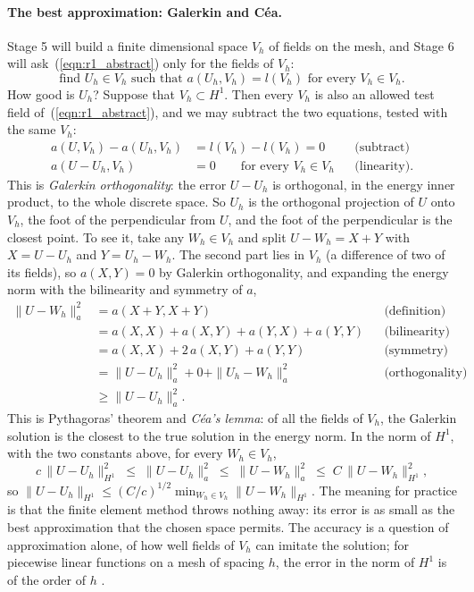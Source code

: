 \paragraph{The best approximation: Galerkin and C\'ea.} Stage 5 will build a finite dimensional space $V_h$ of fields on the mesh, and Stage 6 will ask~(\ref{eqn:r1_abstract}) only for the fields of $V_h$:
\begin{equation}
\label{eqn:r1_galerkin_abstract}
\text{find } U_h \in V_h \text{ such that } a(U_h, V_h) = l(V_h) \text{ for every } V_h \in V_h .
\end{equation}
How good is $U_h$? Suppose that $V_h \subset H^1$. Then every $V_h$ is also an allowed test field of~(\ref{eqn:r1_abstract}), and we may subtract the two equations, tested with the same $V_h$:
\begin{align*}
a(U, V_h) - a(U_h, V_h) &= l(V_h) - l(V_h) = 0 && \text{(subtract)} \\
a(U - U_h, V_h) &= 0 \qquad \text{for every } V_h \in V_h && \text{(linearity)}.
\end{align*}
This is \emph{Galerkin orthogonality}: the error $U - U_h$ is orthogonal, in the energy inner product, to the whole discrete space. So $U_h$ is the orthogonal projection of $U$ onto $V_h$, the foot of the perpendicular from $U$, and the foot of the perpendicular is the closest point. To see it, take any $W_h \in V_h$ and split $U - W_h = X + Y$ with $X = U - U_h$ and $Y = U_h - W_h$. The second part lies in $V_h$ (a difference of two of its fields), so $a(X, Y) = 0$ by Galerkin orthogonality, and expanding the energy norm with the bilinearity and symmetry of $a$,
\begin{align*}
\|U - W_h\|_a^2 &= a(X + Y, X + Y) && \text{(definition)} \\
&= a(X, X) + a(X, Y) + a(Y, X) + a(Y, Y) && \text{(bilinearity)} \\
&= a(X, X) + 2\,a(X, Y) + a(Y, Y) && \text{(symmetry)} \\
&= \|U - U_h\|_a^2 + 0 + \|U_h - W_h\|_a^2 && \text{(orthogonality)} \\
&\geq \|U - U_h\|_a^2 .
\end{align*}
This is Pythagoras' theorem and \emph{C\'ea's lemma}: of all the fields of $V_h$, the Galerkin solution is the closest to the true solution in the energy norm. In the norm of $H^1$, with the two constants above,
for every $W_h \in V_h$,
\begin{equation*}
c\,\|U - U_h\|_{H^1}^2 \;\le\; \|U - U_h\|_a^2 \;\le\; \|U - W_h\|_a^2 \;\le\; C\,\|U - W_h\|_{H^1}^2 ,
\end{equation*}
so $\|U - U_h\|_{H^1} \leq (C/c)^{1/2} \min_{W_h \in V_h} \|U - W_h\|_{H^1}$. The meaning for practice is that the finite element method throws nothing away: its error is as small as the best approximation that the chosen space permits. The accuracy is a question of approximation alone, of how well fields of $V_h$ can imitate the solution; for piecewise linear functions on a mesh of spacing $h$, the error in the norm of $H^1$ is of the order of $h$ \cite{Sayas2015}.


